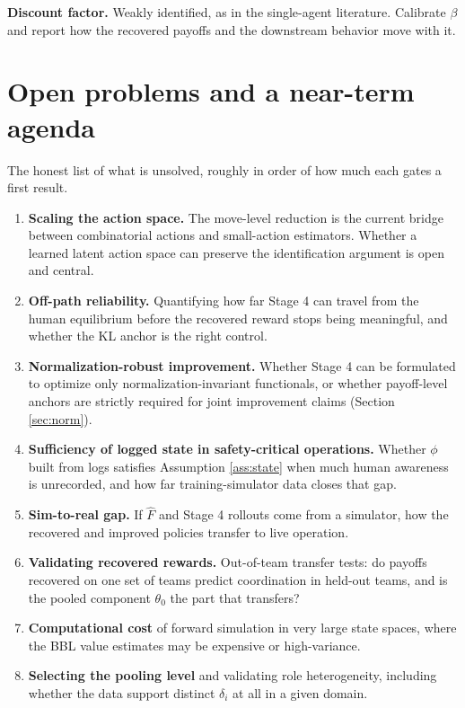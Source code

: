 \documentclass[11pt]{article}
\theoremstyle{definition}
\begin{document}
\textbf{Discount factor.} Weakly identified, as in the single-agent literature. Calibrate $\beta$ and report how the recovered payoffs and the downstream behavior move with it.

\section{Open problems and a near-term agenda}

The honest list of what is unsolved, roughly in order of how much each gates a first result.
\begin{enumerate}[leftmargin=1.6em,itemsep=2pt,topsep=2pt]
  \item \textbf{Scaling the action space.} The move-level reduction is the current bridge between combinatorial actions and small-action estimators. Whether a learned latent action space can preserve the identification argument is open and central.
  \item \textbf{Off-path reliability.} Quantifying how far Stage 4 can travel from the human equilibrium before the recovered reward stops being meaningful, and whether the KL anchor is the right control.
  \item \textbf{Normalization-robust improvement.} Whether Stage 4 can be formulated to optimize only normalization-invariant functionals, or whether payoff-level anchors are strictly required for joint improvement claims (Section \ref{sec:norm}).
  \item \textbf{Sufficiency of logged state in safety-critical operations.} Whether $\phi$ built from logs satisfies Assumption \ref{ass:state} when much human awareness is unrecorded, and how far training-simulator data closes that gap.
  \item \textbf{Sim-to-real gap.} If $\hat F$ and Stage 4 rollouts come from a simulator, how the recovered and improved policies transfer to live operation.
  \item \textbf{Validating recovered rewards.} Out-of-team transfer tests: do payoffs recovered on one set of teams predict coordination in held-out teams, and is the pooled component $\theta_0$ the part that transfers?
  \item \textbf{Computational cost} of forward simulation in very large state spaces, where the BBL value estimates may be expensive or high-variance.
  \item \textbf{Selecting the pooling level} and validating role heterogeneity, including whether the data support distinct $\delta_i$ at all in a given domain.
\end{enumerate}
\end{document}
